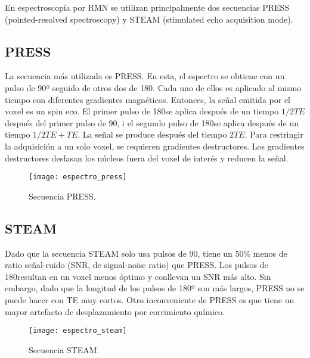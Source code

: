 En espectroscopía por RMN se utilizan principalmente dos secuencias PRESS (pointed-resolved spectroscopy) y STEAM (stimulated echo acquisition mode).


\subsection{PRESS}
La secuencia más utilizada es PRESS. En esta, el espectro se obtiene con un pulso de 90º seguido de otros dos de 180\degrees. Cada uno de ellos es aplicado al mismo tiempo con diferentes gradientes magnéticos. Entonces, la señal emitida por el voxel es un spin eco. El primer pulso de 180\degrees se aplica después de un tiempo $1/2TE$ después del primer pulso de 90\degrees, i el segundo pulso de 180\degrees se aplica después de un tiempo $1/2TE + TE$. La señal se produce después del tiempo $2TE$. Para restringir la adquisición a un solo voxel, se requieren gradientes destructores. Los gradientes destructores desfasan los núcleos fuera del voxel de interés y reducen la señal.



\begin{figure}[htb]
 \begin{figg}
   \texttt{[image: espectro\_press]}
   \caption{Secuencia PRESS.}
 \label{fig:espectro_press}
 \end{figg}
\end{figure}






\subsection{STEAM}
Dado que la secuencia STEAM solo usa pulsos de 90\degrees, tiene un 50\% menos de ratio señal-ruido (SNR, de signal-noise ratio) que PRESS.  Los pulsos de 180\degrees  resultan en un voxel menos óptimo y conllevan un SNR más alto. Sin embargo, dado que la longitud de los pulsos de 180º son más largos, PRESS no se puede hacer con TE muy cortos. Otro inconveniente de PRESS es que tiene un mayor artefacto de desplazamiento por corrimiento químico.

\begin{figure}[htb]
 \begin{figg}
   \texttt{[image: espectro\_steam]}
   \caption{Secuencia STEAM.}
 \label{fig:espectro_steam}
 \end{figg}
\end{figure}


